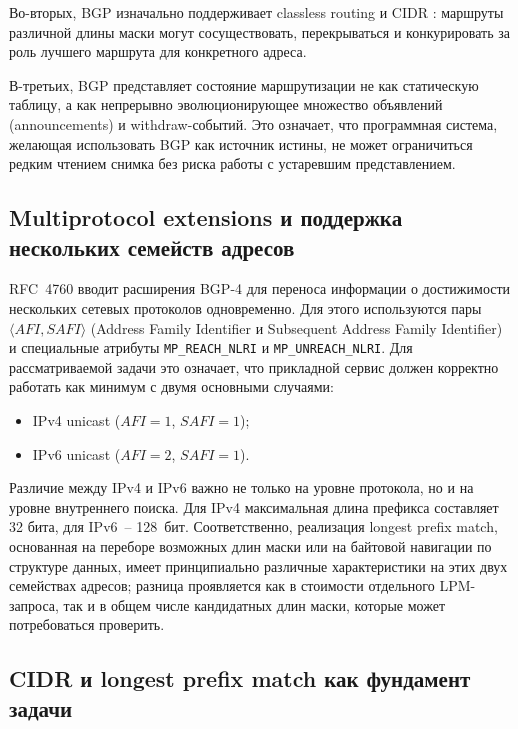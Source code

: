 Во-вторых, BGP изначально поддерживает classless routing и CIDR
\cite{rfc4632}: маршруты различной длины маски могут сосуществовать,
перекрываться и конкурировать за роль лучшего маршрута для конкретного
адреса.

В-третьих, BGP представляет состояние маршрутизации не как статическую
таблицу, а как непрерывно эволюционирующее множество объявлений
(announcements) и withdraw-событий. Это означает, что программная
система, желающая использовать BGP как источник истины, не может
ограничиться редким чтением снимка без риска работы с устаревшим
представлением.

\subsection{Multiprotocol extensions и поддержка нескольких семейств адресов}

RFC~4760 \cite{rfc4760} вводит расширения BGP-4 для переноса информации
о достижимости нескольких сетевых протоколов одновременно. Для этого
используются пары $\langle \mathit{AFI}, \mathit{SAFI} \rangle$
(Address Family Identifier и Subsequent Address Family Identifier) и
специальные атрибуты \texttt{MP\_REACH\_NLRI} и
\texttt{MP\_UNREACH\_NLRI}. Для рассматриваемой задачи это означает,
что прикладной сервис должен корректно работать как минимум с двумя
основными случаями:

\begin{itemize}
\item IPv4 unicast ($\mathit{AFI}=1$, $\mathit{SAFI}=1$);
\item IPv6 unicast ($\mathit{AFI}=2$, $\mathit{SAFI}=1$).
\end{itemize}

Различие между IPv4 и IPv6 важно не только на уровне протокола, но и на
уровне внутреннего поиска. Для IPv4 максимальная длина префикса
составляет 32 бита, для IPv6~-- 128~бит. Соответственно, реализация
longest prefix match, основанная на переборе возможных длин маски или
на байтовой навигации по структуре данных, имеет принципиально
различные характеристики на этих двух семействах адресов; разница
проявляется как в стоимости отдельного LPM-запроса, так и в общем числе
кандидатных длин маски, которые может потребоваться проверить.

\subsection{CIDR и longest prefix match как фундамент задачи}

